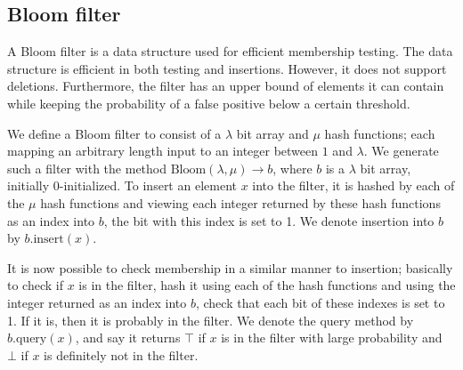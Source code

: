\documentclass[11pt]{article} %
\newcommand{\Bloom}{\ensuremath{\mathrm{Bloom}}}
\renewcommand{\insert}{\ensuremath{\mathrm{insert}}}
\newcommand{\query}{\ensuremath{\mathrm{query}}}
\begin{document}
\subsection{Bloom filter}
A Bloom filter is a data structure used for efficient membership testing. The data structure is efficient in both testing and insertions. However, it does not support deletions. Furthermore, the filter has an upper bound of elements it can contain while keeping the probability of a false positive below a certain threshold.

We define a Bloom filter to consist of a $\lambda$ bit array and $\mu$ hash functions; each mapping an arbitrary length input to an integer between $1$ and $\lambda$. We generate such a filter with the method $\Bloom(\lambda, \mu)\to b$, where $b$ is a $\lambda$ bit array, initially 0-initialized. To insert an element $x$ into the filter, it is hashed by each of the $\mu$ hash functions and viewing each integer returned by these hash functions as an index into $b$, the bit with this index is set to 1. We denote insertion into $b$ by $b.\insert(x)$. 

It is now possible to check membership in a similar manner to insertion; basically to check if $x$ is in the filter, hash it using each of the hash functions and using the integer returned as an index into $b$, check that each bit of these indexes is set to 1. If it is, then it is probably in the filter. We denote the query method by $b.\query(x)$, and say it returns $\top$ if $x$ is in the filter with large probability and $\bot$ if $x$ is definitely not in the filter. 
\end{document}
